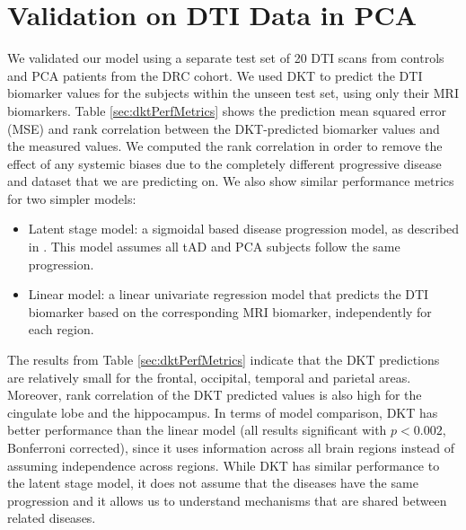 \documentclass{llncs}
\begin{document}
\section{Validation on DTI Data in PCA}
\label{sec:dktResVal}

We validated our model using a separate test set of 20 DTI scans from controls and PCA patients from the DRC cohort. We used DKT to predict the DTI biomarker values for the subjects within the unseen test set, using only their MRI biomarkers. Table \ref{sec:dktPerfMetrics} shows the prediction mean squared error (MSE) and rank correlation between the DKT-predicted biomarker values and the measured values. We computed the rank correlation in order to remove the effect of any systemic biases due to the completely different progressive disease and dataset that we are predicting on. We also show similar performance metrics for two simpler models:
\begin{itemize}
 \item Latent stage model: a sigmoidal based disease progression model, as described in \cite{jedynak2012computational}. This model assumes all tAD and PCA subjects follow the same progression.
 \item Linear model: a linear univariate regression model that predicts the DTI biomarker based on the corresponding MRI biomarker, independently for each region.
\end{itemize}

The results from Table \ref{sec:dktPerfMetrics} indicate that the DKT predictions are relatively small for the frontal, occipital, temporal and parietal areas. Moreover, rank correlation of the DKT predicted values is also high for the cingulate lobe and the hippocampus. In terms of model comparison, DKT has better performance than the linear model (all results significant with $p < 0.002$, Bonferroni corrected), since it uses information across all brain regions instead of assuming independence across regions. While DKT has similar performance to the latent stage model, it does not assume that the diseases have the same progression and it allows us to understand mechanisms that are shared between related diseases. 

\newcommand{\cw}{c}
\end{document}

